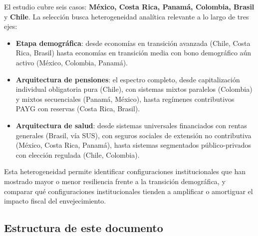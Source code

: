 \documentclass[12pt, letterpaper]{article}
\begin{document}
El estudio cubre seis casos: \textbf{México, Costa Rica, Panamá, Colombia, Brasil} y
\textbf{Chile}. La selección busca heterogeneidad analítica relevante a lo largo de
tres ejes:

\begin{itemize}
  \item \textbf{Etapa demográfica}: desde economías en transición avanzada (Chile,
        Costa Rica, Brasil) hasta economías en transición media con bono demográfico
        aún activo (México, Colombia, Panamá).
  \item \textbf{Arquitectura de pensiones}: el espectro completo, desde
        capitalización individual obligatoria pura (Chile), con sistemas
        mixtos paralelos (Colombia) y mixtos secuenciales (Panamá, México), hasta
        regímenes contributivos PAYG con reservas (Costa Rica, Brasil).
  \item \textbf{Arquitectura de salud}: desde sistemas universales financiados con
        rentas generales (Brasil, vía SUS), con seguros sociales de
        extensión no contributiva (México, Costa Rica, Panamá), hasta sistemas
        segmentados público-privados con elección regulada (Chile, Colombia).
\end{itemize}

Esta heterogeneidad permite identificar configuraciones institucionales que han
mostrado mayor o menor resiliencia frente a la transición demográfica, y comparar
qué configuraciones institucionales tienden a amplificar o amortiguar el impacto
fiscal del envejecimiento.

\subsection{Estructura de este documento}
\end{document}
